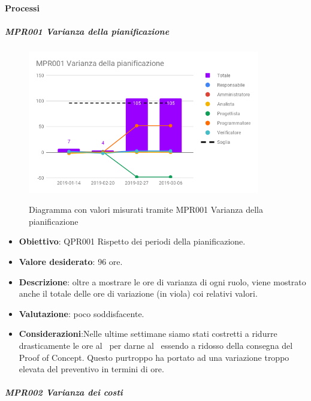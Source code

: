 	\paragraph{Processi}

	\subparagraph{MPR001 Varianza della pianificazione}

	\begin{figure}[H]
		\centering
		\includegraphics[width=0.9\textwidth]{img/cruscotti/RP/MPR001.png}
		\label{immagineVarianzaPianificazioneRP}
		\caption{Diagramma con valori misurati tramite MPR001 Varianza della pianificazione}
	\end{figure}

	\begin{itemize}
		\item \textbf{Obiettivo}: QPR001 Rispetto dei periodi della pianificazione.
		\item \textbf{Valore desiderato}: 96 ore.
		\item \textbf{Descrizione}: oltre a mostrare le ore di varianza di ogni ruolo, viene mostrato anche il totale delle ore di variazione (in viola) coi relativi valori.
		\item \textbf{Valutazione}: poco soddisfacente.
		\item \textbf{Considerazioni}:Nelle ultime settimane siamo stati costretti a ridurre drasticamente le ore al \Prog\ per darne al \Progr\ essendo a ridosso della consegna del Proof of Concept. Questo purtroppo ha portato ad una variazione troppo elevata del preventivo in termini di ore.
	\end{itemize}


	\subparagraph{MPR002 Varianza dei costi}

